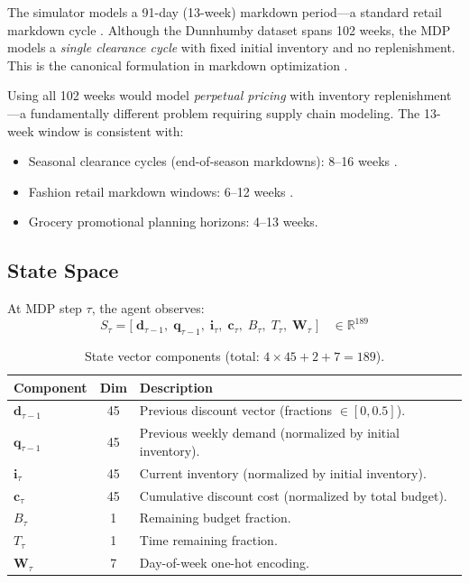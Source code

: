 \documentclass[11pt,a4paper]{article}
\begin{document}
The simulator models a 91-day (13-week) markdown period---a standard retail markdown cycle \citep{phillips2005}.
Although the Dunnhumby dataset spans 102 weeks, the MDP models a \emph{single clearance cycle} with fixed initial inventory and no replenishment.
This is the canonical formulation in markdown optimization \citep{talluri2004}.

Using all 102 weeks would model \emph{perpetual pricing} with inventory replenishment---a fundamentally different problem requiring supply chain modeling.
The 13-week window is consistent with:
\begin{itemize}
    \item Seasonal clearance cycles (end-of-season markdowns): 8--16 weeks \citep{phillips2005}.
    \item Fashion retail markdown windows: 6--12 weeks \citep{fisher2010}.
    \item Grocery promotional planning horizons: 4--13 weeks.
\end{itemize}

\subsection{State Space}

At MDP step $\tau$, the agent observes:
\begin{equation}
\boxed{
S_\tau = \bigl[\;\mathbf{d}_{\tau-1},\;\mathbf{q}_{\tau-1},\;\mathbf{i}_\tau,\;\mathbf{c}_{\tau},\;B_\tau,\;T_\tau,\;\mathbf{W}_\tau\;\bigr]
} \quad \in \mathbb{R}^{189}
\end{equation}

\begin{table}[H]
\centering
\caption{State vector components (total: $4 \times 45 + 2 + 7 = 189$).}
\begin{tabular}{@{}lcl@{}}
\toprule
\textbf{Component} & \textbf{Dim} & \textbf{Description} \\
\midrule
$\mathbf{d}_{\tau-1}$ & 45 & Previous discount vector (fractions $\in [0, 0.5]$). \\
$\mathbf{q}_{\tau-1}$ & 45 & Previous weekly demand (normalized by initial inventory). \\
$\mathbf{i}_\tau$ & 45 & Current inventory (normalized by initial inventory). \\
$\mathbf{c}_{\tau}$ & 45 & Cumulative discount cost (normalized by total budget). \\
$B_\tau$ & 1 & Remaining budget fraction. \\
$T_\tau$ & 1 & Time remaining fraction. \\
$\mathbf{W}_\tau$ & 7 & Day-of-week one-hot encoding. \\
\bottomrule
\end{tabular}
\end{table}
\end{document}
